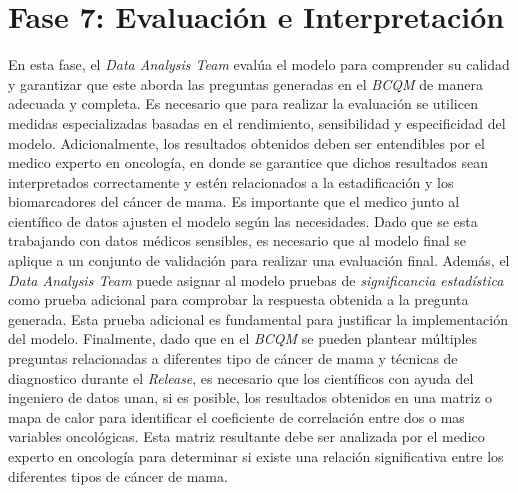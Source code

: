 \section{Fase 7: Evaluación e Interpretación}
En esta fase, el \textit{Data Analysis Team} evalúa el modelo para comprender su calidad y garantizar que este aborda las preguntas generadas en el \textit{BCQM} de manera adecuada y completa. Es necesario que para realizar la evaluación se utilicen medidas especializadas basadas en el rendimiento, sensibilidad y especificidad del modelo. Adicionalmente, los resultados obtenidos deben ser entendibles por el medico experto en oncología, en donde se garantice que dichos resultados sean interpretados correctamente y estén relacionados a la estadificación y los biomarcadores del cáncer de mama. Es importante que el medico junto al científico de datos ajusten el modelo según las necesidades. Dado que se esta trabajando con datos médicos sensibles, es necesario que al modelo final se aplique a un conjunto de validación para realizar una evaluación final. Además, el \textit{Data Analysis Team} puede asignar al modelo pruebas de \textit{significancia estadística} como prueba adicional para comprobar la respuesta obtenida a la pregunta generada. Esta prueba adicional es fundamental para justificar la implementación del modelo. Finalmente, dado que en el \textit{BCQM} se pueden plantear múltiples preguntas relacionadas a diferentes tipo de cáncer de mama y técnicas de diagnostico durante el \textit{Release}, es necesario que los científicos con ayuda del ingeniero de datos unan, si es posible, los resultados obtenidos en una matriz o mapa de calor para identificar el coeficiente de correlación entre dos o mas variables oncológicas. Esta matriz resultante debe ser analizada por el medico experto en oncología para determinar si existe una relación significativa entre los diferentes tipos de cáncer de mama.
